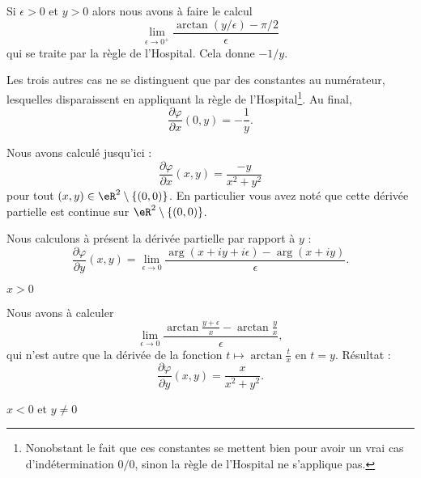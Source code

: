 \begin{normaltext}
\begin{subproof}
		Si \( \epsilon>0\) et \( y>0\) alors nous avons à faire le calcul
		\begin{equation}
			\lim_{\epsilon\to 0^+}\frac{ \arctan(y/\epsilon)-\pi/2 }{ \epsilon }
		\end{equation}
		qui se traite par la règle de l'Hospital. Cela donne \( -1/y\).

		Les trois autres cas ne se distinguent que par des constantes au numérateur, lesquelles disparaissent en appliquant la règle de l'Hospital\footnote{Nonobstant le fait que ces constantes se mettent bien pour avoir un vrai cas d'indétermination \( 0/0\), sinon la règle de l'Hospital ne s'applique pas.}. Au final,
		\begin{equation}
			\frac{ \partial \varphi }{ \partial x }(0,y)=-\frac{1}{ y }.
		\end{equation}
	\end{subproof}

	Nous avons calculé jusqu'ici :
	\begin{equation}        \label{EQooAOJPooOrvUBR}
		\frac{ \partial \varphi }{ \partial x }(x,y)=\frac{ -y }{ x^2+y^2 }
	\end{equation}
	pour tout \( (x,y)\in \eR^2\setminus\{ (0,0) \}\). En particulier vous avez noté que cette dérivée partielle est continue sur \( \eR^2\setminus\{ (0,0) \}\).

	Nous calculons à présent la dérivée partielle par rapport à \( y\) :
	\begin{equation}
		\frac{ \partial \varphi }{ \partial y }(x,y)=\lim_{\epsilon\to 0}\frac{ \arg(x+iy+i\epsilon)-\arg(x+iy) }{ \epsilon }.
	\end{equation}

	\begin{subproof}

		\item[\( x>0\)]

		Nous avons à calculer
		\begin{equation}
			\lim_{\epsilon\to 0}\frac{ \arctan\frac{ y+\epsilon }{ x }-\arctan\frac{ y }{ x } }{ \epsilon },
		\end{equation}
		qui n'est autre que la dérivée de la fonction \( t\mapsto\arctan\frac{ t }{ x }\) en \( t=y\). Résultat :
		\begin{equation}
			\frac{ \partial \varphi }{ \partial y }(x,y)=\frac{ x }{ x^2+y^2 }.
		\end{equation}

		\item[\( x<0  \) et \( y\neq 0\)]


\end{subproof}
\end{normaltext}

